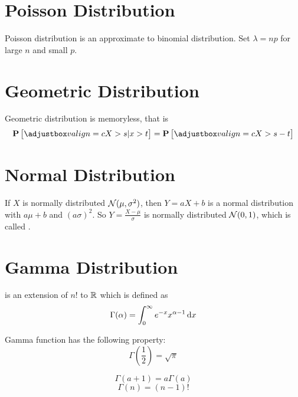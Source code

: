 \section{Poisson Distribution}

Poisson distribution is an approximate to binomial distribution. Set $\lambda = n p $ for large $n$ and small $p$.


\section{Geometric Distribution}

Geometric distribution is memoryless, that is 
\begin{equation}
    \probability{X > s | x > t} = \probability{X > s - t}
\end{equation}


\section{Normal Distribution}

\begin{theorem}
    If $X$ is normally distributed $\mathcal{N}(\mu,\sigma^2)$, then $Y = aX + b$ is a normal distribution with $a\mu + b$ and $(a\sigma)^2$. So $Y =\displaystyle \frac{X - \mu}{\sigma}$ is normally distributed $\mathcal{N}(0,1)$, which is called .
\end{theorem}



\section{Gamma Distribution}

\begin{definition}
     is an extension of $n!$ to $\mathbb{R}$ which is defined as
    \begin{equation}
        \Gamma(\alpha) = \int_0^\infty e^{-x} x^{\alpha - 1} \dif{x}
    \end{equation}

    Gamma function has the following property:
    \begin{equation}
        \Gamma \left(\frac{1}{2} \right) = \sqrt{\pi}
    \end{equation}
    
    \begin{equation}
        \Gamma (a + 1) = a \Gamma(a)
    \end{equation}
    \begin{equation}
        \Gamma (n) = (n-1)!
    \end{equation}
\end{definition}


